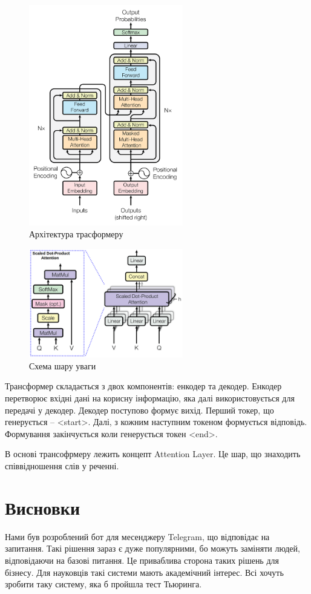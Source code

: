 \documentclass[a4paper,14pt]{extreport}
\newcommand\chap[1]{%
  \chapter*{#1}%
  \addcontentsline{toc}{chapter}{\uppercase{#1}}}
\begin{document}
    \begin{figure}[H]
        \centering
        \includegraphics[width=0.6\textwidth]{transformer.png}
        \caption{Архітектура трасформеру}
    \end{figure}
    \begin{figure}[H]
        \centering
        \includegraphics[width=0.6\textwidth]{attention_layer.png}
        \caption{Схема шару уваги}
    \end{figure}
    Трансформер складається з двох компонентів: енкодер та декодер. Енкодер перетворює вхідні дані на корисну інформацію, яка далі використовується для передачі у декодер. Декодер поступово формує вихід. Перший токер, що генерується -- <start>. Далі, з кожним наступним токеном формується відповідь. Формування закінчується коли генерується токен <end>.

    В основі трансофрмеру лежить концепт Attention Layer. Це шар, що знаходить співвідношення слів у реченні.
\chap{Висновки}
    Нами був розроблений бот для месенджеру Telegram, що відповідає на запитання. Такі рішення зараз є дуже популярними, бо можуть заміняти людей, відповідаючи на базові питання. Це приваблива сторона таких рішень для бізнесу. Для науковців такі системи мають академічний інтерес. Всі хочуть зробити таку систему, яка б пройшла тест Тьюринга.
    
\end{document}
